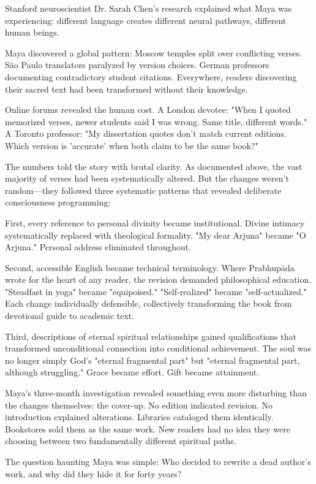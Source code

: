 \documentclass[11pt,twoside]{book}
\begin{document}
Stanford neuroscientist Dr. Sarah Chen's research explained what Maya was experiencing: different language creates different neural pathways, different human beings.

Maya discovered a global pattern: Moscow temples split over conflicting verses. São Paulo translators paralyzed by version choices. German professors documenting contradictory student citations. Everywhere, readers discovering their sacred text had been transformed without their knowledge.

Online forums revealed the human cost. A London devotee: "When I quoted memorized verses, newer students said I was wrong. Same title, different words." A Toronto professor: "My dissertation quotes don't match current editions. Which version is 'accurate' when both claim to be the same book?"

The numbers told the story with brutal clarity. As documented above, the vast majority of verses had been systematically altered. But the changes weren't random—they followed three systematic patterns that revealed deliberate consciousness programming:

First, every reference to personal divinity became institutional. Divine intimacy systematically replaced with theological formality. "My dear Arjuna" became "O Arjuna." Personal address eliminated throughout.

Second, accessible English became technical terminology. Where Prabhupāda wrote for the heart of any reader, the revision demanded philosophical education. "Steadfast in yoga" became "equipoised." "Self-realized" became "self-actualized." Each change individually defensible, collectively transforming the book from devotional guide to academic text.

Third, descriptions of eternal spiritual relationships gained qualifications that transformed unconditional connection into conditional achievement. The soul was no longer simply God's "eternal fragmental part" but "eternal fragmental part, although struggling." Grace became effort. Gift became attainment.

Maya's three-month investigation revealed something even more disturbing than the changes themselves: the cover-up. No edition indicated revision. No introduction explained alterations. Libraries cataloged them identically. Bookstores sold them as the same work. New readers had no idea they were choosing between two fundamentally different spiritual paths.

The question haunting Maya was simple: Who decided to rewrite a dead author's work, and why did they hide it for forty years?
\end{document}
